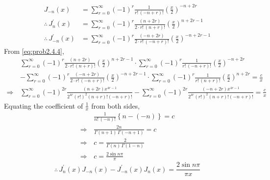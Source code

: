 \documentclass[../main-sheet.tex]{subfiles}
\begin{document}
\begin{soln}
\begin{align*}
        J_{-n}(x)&=\sum_{r=0}^\infty (-1)^r \frac{1}{r!\,(-n+r)!}\left( \frac{x}{2} \right)^{-n+2r}\\
        \therefore\, J_n^{'}(x)&=\sum_{r=0}^\infty (-1)^r \frac{\left( n+2r \right)}{2\cdot r!\,(n+r)!}\left( \frac{x}{2} \right)^{n+2r-1}\\
        \therefore\, J_{-n}^{'}(x)&=\sum_{r=0}^\infty (-1)^r \frac{\left( -n+2r \right)}{2\cdot r!\,(-n+r)!}\left( \frac{x}{2} \right)^{-n+2r-1}
    \end{align*}
    From \eqref{eq:prob2.4.4},
    \begin{align*}
        & \sum_{r=0}^\infty (-1)^r \frac{\left( n+2r \right)}{2\cdot r!\,(n+r)!}\left( \frac{x}{2} \right)^{n+2r-1}\cdot \sum_{r=0}^\infty (-1)^r \frac{1}{r!\,(-n+r)!}\left( \frac{x}{2} \right)^{-n+2r}\\
        &-\sum_{r=0}^\infty (-1)^r \frac{\left( -n+2r \right)}{2\cdot r!\,(-n+r)!}\left( \frac{x}{2} \right)^{-n+2r-1}\cdot \sum_{r=0}^\infty (-1)^r \frac{1}{r!\,(n+r)!}\left( \frac{x}{2} \right)^{n+2r}=\frac{c}{x}\\
        \Rightarrow\, & \sum_{r=0}^\infty (-1)^{2r}\frac{(n+2r)x^{4r-1}}{2^{4r}(r!)^2(n+r)!(-n+r)!}-\sum_{r=0}^\infty (-1)^{2r}\frac{(-n+2r)x^{4r-1}}{2^{4r}(r!)^2(n+r)!(-n+r)!}=\frac{c}{x}
    \end{align*}
    Equating the coefficient of $ \frac{1}{x} $ from both sides,
    \begin{align*}
        & \frac{1}{n!\,(-n)!}\left\{ n-(-n)\right\}=c\\
        \Rightarrow\, & \frac{2n}{\Gamma(n+1)\,\Gamma(-n+1)}=c\\
        \Rightarrow\, & c=\frac{2}{\Gamma(n)\,\Gamma(1-n)}\\
        \Rightarrow\, & c=\frac{2\sin n\pi}{\pi}
    \end{align*}
    \[
        \therefore\, J_{n}^{'}(x)J_{-n}^{}(x)-J_{-n}^{'}(x)J_{n}^{}(x)=\frac{2\sin n\pi}{\pi x}
    \]
\end{soln}
\end{document}
